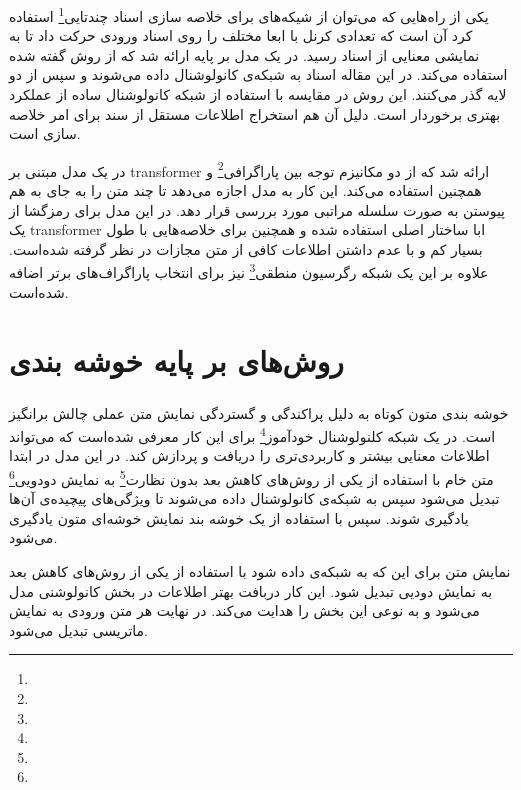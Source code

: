 \documentclass[12pt, a4paper, oneside]{report}
\begin{document}
یکی از راه‌هایی که می‌توان از شیکه‌های
برای خلاصه سازی اسناد چندتایی\footnote{}
استفاده کرد آن است که تعدادی کرنل با ابعا مختلف را روی اسناد ورودی حرکت داد تا به نمایشی معنایی از
اسناد رسید. در
\cite{ziqiang2015prior}
یک مدل بر پایه
ارائه شد که از روش گفته شده استفاده می‌کند. در این مقاله اسناد به شبکه‌ی کانولوشنال داده می‌شوند و سپس
از دو لایه
گذر می‌کنند. این روش در مقایسه با استفاده از شبکه کانولوشنال ساده از عملکرد بهتری برخوردار است. دلیل آن هم
استخراج اطلاعات مستقل از سند برای امر خلاصه سازی است.

در
\cite{liu2019hierarchical}
یک مدل مبتنی بر
transformer
ارائه شد که از دو مکانیزم توجه بین پاراگرافی\footnote{}
و همچنین
استفاده می‌کند. این کار به مدل اجازه می‌دهد تا چند متن را به جای به هم پیوستن
به صورت سلسله مراتبی مورد بررسی قرار دهد. در این مدل برای رمزگشا از یک
transformer
ابا ساختار اصلی استفاده شده و همچنین برای خلاصه‌هایی با طول بسیار کم و با عدم داشتن اطلاعات کافی از متن
مجازات در نظر گرفته شده‌است. علاوه بر این یک شبکه رگرسیون منطقی\footnote{}
نیز برای انتخاب پاراگراف‌های برتر اضافه شده‌است.

\section{روش‌های بر پایه خوشه بندی}

\subsubsection{}

خوشه بندی متون کوتاه به دلیل پراکندگی و گستردگی نمایش متن عملی چالش برانگیز است.
در
\cite{Xu2017}
یک شبکه کلنولوشنال خودآموز\footnote{}
برای این کار معرفی شده‌است که می‌تواند اطلاعات معنایی بیشتر و کاربردی‌تری  را دریافت و پردازش کند.
در این مدل در ابتدا متن خام با استفاده از یکی از روش‌های کاهش بعد بدون نظارت\footnote{}
به نمایش دودویی\footnote{}
تبدیل می‌شود سپس به شبکه‌ی کانولوشنال داده می‌شوند تا ویژگی‌های پیچیده‌ی آن‌ها یادگیری شوند.
سپس با استفاده از یک خوشه بند
نمایش خوشه‌ای متون یادگیری می‌شود.

نمایش
متن برای این که به شبکه‌ی
داده شود با استفاده از یکی از روش‌های کاهش بعد به نمایش دودیی تبدیل شود. این کار دربافت بهتر اطلاعات
در بخش کانولوشنی مدل می‌شود و به نوعی این بخش را هدایت می‌کند. در نهایت هر متن ورودی به نمایش
ماتریسی تبدیل می‌شود.
\end{document}
